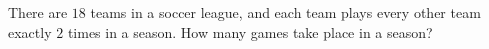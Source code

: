 There are $18$ teams in a soccer league, and each team plays every other team exactly $2$ times in a season. How many games take place in a season?
